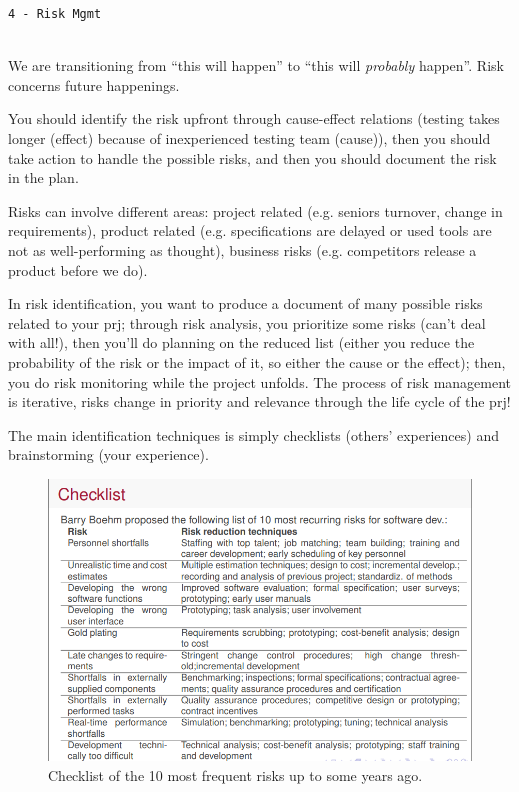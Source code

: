 
\begin{center}\texttt{4 - Risk Mgmt}\end{center}
\hrulefill \\

\noindent We are transitioning from ``this will happen'' to ``this will \textit{probably} happen''. Risk concerns future happenings.

\noindent You should identify the risk upfront through cause-effect relations (testing takes longer (effect) because of inexperienced testing team (cause)), then you should take action to handle the possible risks, and then you should document the risk in the plan. 

\noindent Risks can involve different areas: project related (e.g. seniors turnover, change in requirements), product related (e.g. specifications are delayed or used tools are not as well-performing as thought), business risks (e.g. competitors release a product before we do).

\noindent In risk identification, you want to produce a document of many possible risks related to your prj; through risk analysis, you prioritize some risks (can't deal with all!), then you'll do planning on the reduced list (either you reduce the probability of the risk or the impact of it, so either the cause or the effect); then, you do risk monitoring while the project unfolds. The process of risk management is iterative, risks change in priority and relevance through the life cycle of the prj!

\noindent The main identification techniques is simply checklists (others' experiences) and brainstorming (your experience).

\begin{figure} [H]
    \centering
    \includegraphics[width=0.75\linewidth]{Figures//04/checklist.png}
    \caption{Checklist of the 10 most frequent risks up to some years ago.}
\end{figure}

